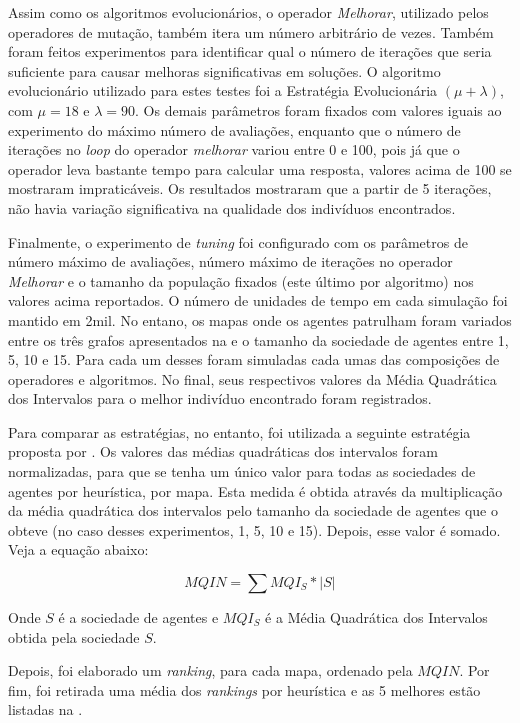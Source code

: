 Assim como os algoritmos evolucionários, o operador \textit{Melhorar}, utilizado 
pelos operadores de mutação, também itera um número arbitrário de vezes. Também 
foram feitos experimentos para identificar qual o número de iterações que seria 
suficiente para causar melhoras significativas em soluções. O algoritmo 
evolucionário utilizado para estes testes foi a Estratégia Evolucionária 
$(\mu + \lambda)$, com $\mu = 18$ e $\lambda = 90$. Os demais parâmetros foram 
fixados com valores iguais ao experimento do máximo número de avaliações, 
enquanto que o número de iterações no \textit{loop} do operador 
\textit{melhorar} variou entre 0 e 100, pois já que o operador leva bastante 
tempo para calcular uma resposta, valores acima de 100 se mostraram 
impraticáveis. Os resultados mostraram que a partir de 5 iterações, não havia 
variação significativa na qualidade dos indivíduos encontrados.

Finalmente, o experimento de \textit{tuning} foi configurado com os parâmetros 
de número máximo de avaliações, número máximo de iterações no operador 
\textit{Melhorar} e o tamanho da população fixados (este 
último por algoritmo) nos valores acima reportados. O número de unidades de 
tempo em cada simulação foi mantido em 2mil. No entano, os mapas onde os agentes 
patrulham foram variados entre os três grafos apresentados na  
e o tamanho da sociedade de agentes entre 1, 5, 10 e 15. Para cada um desses 
foram simuladas cada umas das composições de operadores e algoritmos. No final, 
seus respectivos valores da Média Quadrática dos Intervalos para o melhor 
indivíduo encontrado foram registrados.

Para comparar as estratégias, no entanto, foi utilizada a seguinte estratégia 
proposta por \citep{sampaiophd}. Os valores das médias quadráticas dos 
intervalos foram normalizadas, para que se tenha um único valor para todas as 
sociedades de agentes por heurística, por mapa. Esta medida é obtida através da 
multiplicação da média quadrática dos intervalos pelo tamanho da sociedade de 
agentes que o obteve (no caso desses experimentos, 1, 5, 10 e 15). Depois, esse 
valor é somado. Veja a equação abaixo:

$$MQIN = \sum MQI_{S} * |S|$$

Onde $S$ é a sociedade de agentes e $MQI_{S}$ é a Média Quadrática dos 
Intervalos obtida pela sociedade $S$.

Depois, foi elaborado um \textit{ranking}, para cada mapa, ordenado pela $MQIN$. 
Por fim, foi retirada uma média dos \textit{rankings} por heurística e as 5 
melhores estão listadas na .


